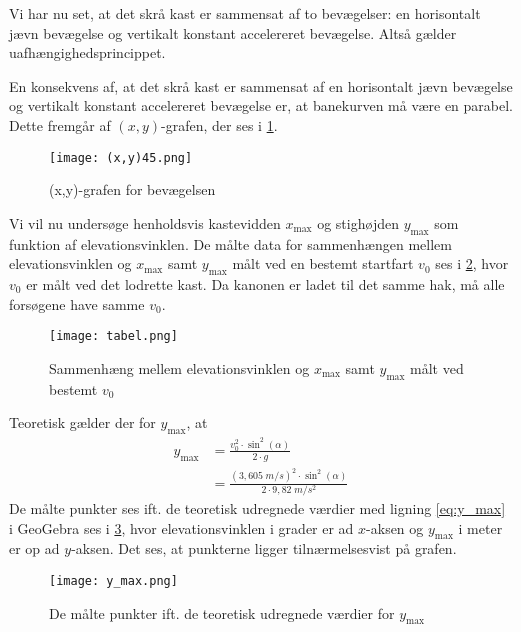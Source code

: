 \documentclass{report}
\begin{document}
Vi har nu set, at det skrå kast er sammensat af to bevægelser: en horisontalt jævn bevægelse og vertikalt konstant accelereret bevægelse.
Altså gælder uafhængighedsprincippet.

En konsekvens af, at det skrå kast er sammensat af en horisontalt jævn bevægelse og vertikalt konstant accelereret bevægelse er, at banekurven må være en parabel.
Dette fremgår af $(x,y)$-grafen, der ses i \cref{fig:xy}.
\begin{figure}[H]
\begin{center}
  \texttt{[image: (x,y)45.png]}
\end{center}
  \caption{(x,y)-grafen for bevægelsen}
\label{fig:xy}
\end{figure}
Vi vil nu undersøge henholdsvis kastevidden $x_{\text{max} }$ og stighøjden $y_{\text{max} }$ som funktion af elevationsvinklen.
De målte data for sammenhængen mellem elevationsvinklen og $x _{\text{max} }$ samt $y_{\text{max} }$ målt ved en bestemt startfart $v_0$ ses i \cref{fig:tabel}, hvor $v_0$ er målt ved det lodrette kast.
Da kanonen er ladet til det samme hak, må alle forsøgene have samme $v_0$.
\begin{figure}[H]
\begin{center}
  \texttt{[image: tabel.png]}
\end{center}
  \caption{Sammenhæng mellem elevationsvinklen og $x _{\text{max} }$ samt $y_{\text{max} }$ målt ved bestemt $v_0$ }
\label{fig:tabel}
\end{figure}
Teoretisk gælder der for $y_{\text{max} }$, at
\begin{equation}
  \label{eq:y_max}
\begin{split}
  y _{\text{max} }&=\frac{v_0^2 \cdot \sin^2\left(\alpha\right) }{2 \cdot g}\\
  &=\frac{\left(3,605 \;\unit{m/s} \right)^2 \cdot \sin^2\left(\alpha\right) }{2 \cdot 9,82 \;\unit{m/s^2} }
\end{split}
\end{equation}
De målte punkter ses ift. de teoretisk udregnede værdier med ligning \ref{eq:y_max} i GeoGebra ses i \cref{fig:y_max}, hvor elevationsvinklen i grader er ad $x$-aksen og $y_{\text{max} }$ i meter er op ad $y$-aksen. 
Det ses, at punkterne ligger tilnærmelsesvist på grafen.
\begin{figure}[H]
\begin{center}
  \texttt{[image: y\_max.png]}
\end{center}
  \caption{De målte punkter ift. de teoretisk udregnede værdier for $y_{\text{max} }$}
\label{fig:y_max}
\end{figure}
\end{document}
